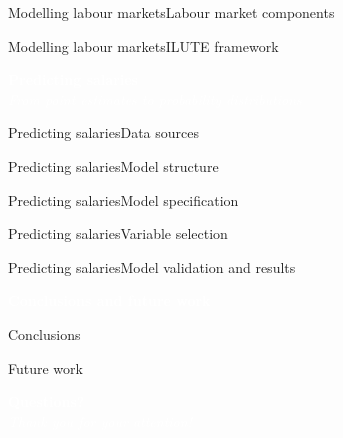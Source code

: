 \documentclass[aspectratio=169]{beamer}
\begin{document}
\begin{frame}{Modelling labour markets}{Labour market components}
\end{frame}    

\begin{frame}{Modelling labour markets}{ILUTE framework}
\end{frame}

{
\begin{frame}
    \begin{center}
        \textcolor{white}{{\fontsize{22pt}{14pt}\selectfont \textbf{Predicting salaries}}}\\
        \vspace{20pt}
        \textcolor{white}{{\fontsize{14pt}{10pt}\selectfont \textsl{From point estimates to probability distributions}}}
    \end{center}
\end{frame}
}

\begin{frame}{Predicting salaries}{Data sources}
\end{frame}    

\begin{frame}{Predicting salaries}{Model structure}
\end{frame}

\begin{frame}{Predicting salaries}{Model specification}
\end{frame}

\begin{frame}{Predicting salaries}{Variable selection}
\end{frame}

\begin{frame}{Predicting salaries}{Model validation and results}
\end{frame}

{
\begin{frame}
    \begin{center}
        \textcolor{white}{{\fontsize{22pt}{14pt}\selectfont \textbf{Conclusions and future work}}}\\
    \end{center}
\end{frame}
}

\begin{frame}{Conclusions}
\end{frame}

\begin{frame}{Future work}
\end{frame}

{
\begin{frame}
    \begin{center}
        \textcolor{white}{{\fontsize{22pt}{14pt}\selectfont \textbf{Questions?}}}\\
        \vspace{20pt}
        \textcolor{white}{{\fontsize{14pt}{10pt}\selectfont \textsl{Thank you for your attention!}}}
    \end{center}
\end{frame}
}
\end{document}
